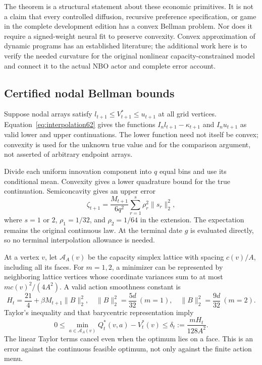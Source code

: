 The theorem is a structural statement about these economic primitives. It is not a claim that every controlled diffusion, recursive preference specification, or game in the complete development edition has a convex Bellman problem. Nor does it require a signed-weight neural fit to preserve convexity. Convex approximation of dynamic programs has an established literature; the additional work here is to verify the needed curvature for the original nonlinear capacity-constrained model and connect it to the actual NBO actor and complete error account.

\subsection{Certified nodal Bellman bounds}
Suppose nodal arrays satisfy $l_{t+1}\le V_{t+1}^*\le u_{t+1}$ at all grid vertices. Equation~\eqref{eq:interpolation62} gives the functions $I_nl_{t+1}-\kappa_{t+1}$ and $I_nu_{t+1}$ as valid lower and upper continuations. The lower function need not itself be convex; convexity is used for the unknown true value and for the comparison argument, not asserted of arbitrary endpoint arrays.

Divide each uniform innovation component into $q$ equal bins and use its conditional mean. Convexity gives a lower quadrature bound for the true continuation. Semiconcavity gives an upper error
\begin{equation}\label{eq:quadrature62}
 \zeta_{t+1}=\frac{M_{t+1}}{6q^2}
                      \sum_{r=1}^{s}\rho_r^2\|s_r\|_2^2,
\end{equation}
where $s=1$ or $2$, $\rho_1=1/32$, and $\rho_2=1/64$ in the extension. The expectation remains the original continuous law. At the terminal date $g$ is evaluated directly, so no terminal interpolation allowance is needed.

At a vertex $v$, let $\mathcal A_A(v)$ be the capacity simplex lattice with spacing $c(v)/A$, including all its faces. For $m=1,2$, a minimizer can be represented by neighboring lattice vertices whose coordinate variances sum to at most $m c(v)^2/(4A^2)$. A valid action smoothness constant is
\[
 H_t=\frac{21}{4}+\beta M_{t+1}\|B\|_2^2,
 \quad \|B\|_2^2=\frac{5d}{32}\ (m=1),\quad
 \|B\|_2^2=\frac{9d}{32}\ (m=2).
\]
Taylor's inequality and that barycentric representation imply
\begin{equation}\label{eq:action-cover62}
 0\le\min_{a\in\mathcal A_A(v)}Q_t^*(v,a)-V_t^*(v)
       \le\delta_t:=\frac{mH_t}{128A^2}.
\end{equation}
The linear Taylor terms cancel even when the optimum lies on a face. This is an error against the continuous feasible optimum, not only against the finite action menu.

